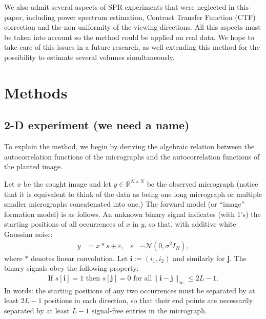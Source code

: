 \documentclass[english,11pt]{article}
\newcommand{\1}{\mathbf{1}}
\newcommand{\TODO}[1]{{\color{red}{[#1]}}}
\numberwithin{equation}{section}
\theoremstyle{plain}
\theoremstyle{definition}
\theoremstyle{remark}
\theoremstyle{plain}
\theoremstyle{remark}
\theoremstyle{plain}
\theoremstyle{plain}
\newcommand{\RNN}{\mathbb{R}^{N\times N}}
\begin{document}
We also admit several aspects of SPR experiments that were neglected in this paper, including power spectrum estimation, Contrast Transfer Function (CTF) correction and the non-uniformity of the viewing directions. All this aspects must be taken into account so the method could be applied on real data. We hope to take care of this issues in a future research, as well extending this method for the possibility to estimate several volumes simultaneously. 
%

\TODO{Where and how do we cite Kam? Fred?}

\section{Methods} \label{sec:methods}

\subsection{2-D experiment (we need a name)}
To explain the method, we begin by deriving the algebraic relation between the autocorrelation functions of the micrographs and the autocorrelation functions of the planted image.

Let $x$ be the sought image and let $y\in\RNN$ be the observed micrograph (notice that it is equivalent to think of the data as being one long micrograph or multiple smaller micrographs concatenated into one.)
The forward model (or ``image'' formation model) is as follows. An unknown binary signal  indicates (with 1's) the starting positions of all occurrences of $x$ in $y$, so that, with additive white Gaussian noise:
\begin{align}
	y & =  x \ast s + \varepsilon, & \varepsilon & \sim \mathcal{N}(0,\sigma^2 I_N),
	\label{eq:model}
\end{align}
where $\ast$ denotes linear convolution. Let $\textbf{i}:=(i_1,i_2)$ and similarly for \textbf{j}.
The binary signals obey the following property:
\begin{align}
	\textrm{If } s[\textbf{i}] = 1 \textrm{ then } s[\textbf{j}] = 0 \textrm{ for all}  \|\textbf{i}-\textbf{j}\|_\infty\leq 2L-1.
	\label{eq:spacing}
\end{align}
In words: the starting positions of any two occurrences must be separated by at least $2L-1$ positions in each direction, so that their end points are necessarily separated by at least $L-1$ signal-free entries in the micrograph.
\end{document}
